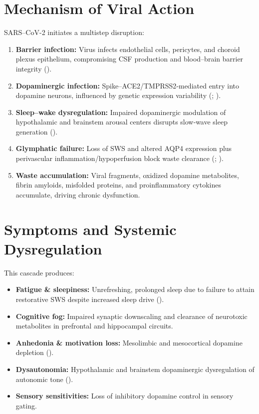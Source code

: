 \documentclass[12pt]{article}
\begin{document}
\section{Mechanism of Viral Action}
SARS–CoV-2 initiates a multistep disruption:
\begin{enumerate}
  \item \textbf{Barrier infection:} Virus infects endothelial cells, pericytes, and choroid plexus epithelium, compromising CSF production and blood–brain barrier integrity (\citealp{Yang2021}).
  \item \textbf{Dopaminergic infection:} Spike–ACE2/TMPRSS2‐mediated entry into dopamine neurons, influenced by genetic expression variability (\citealp{Cao2020}; \citealp{Hou2021}).
  \item \textbf{Sleep–wake dysregulation:} Impaired dopaminergic modulation of hypothalamic and brainstem arousal centers disrupts slow‐wave sleep generation (\citealp{Lazarus2019}).
  \item \textbf{Glymphatic failure:} Loss of SWS and altered AQP4 expression plus perivascular inflammation/hypoperfusion block waste clearance (\citealp{Iliff2012}; \citealp{Gaberel2014}).
  \item \textbf{Waste accumulation:} Viral fragments, oxidized dopamine metabolites, fibrin amyloids, misfolded proteins, and proinflammatory cytokines accumulate, driving chronic dysfunction.
\end{enumerate}

\section{Symptoms and Systemic Dysregulation}
This cascade produces:
\begin{itemize}
  \item \textbf{Fatigue \& sleepiness:} Unrefreshing, prolonged sleep due to failure to attain restorative SWS despite increased sleep drive (\citealp{Xie2013}).
  \item \textbf{Cognitive fog:} Impaired synaptic downscaling and clearance of neurotoxic metabolites in prefrontal and hippocampal circuits.
  \item \textbf{Anhedonia \& motivation loss:} Mesolimbic and mesocortical dopamine depletion (\citealp{Beauchamp2022}).
  \item \textbf{Dysautonomia:} Hypothalamic and brainstem dopaminergic dysregulation of autonomic tone (\citealp{Tanaka2021}).
  \item \textbf{Sensory sensitivities:} Loss of inhibitory dopamine control in sensory gating.
\end{itemize}
\end{document}
